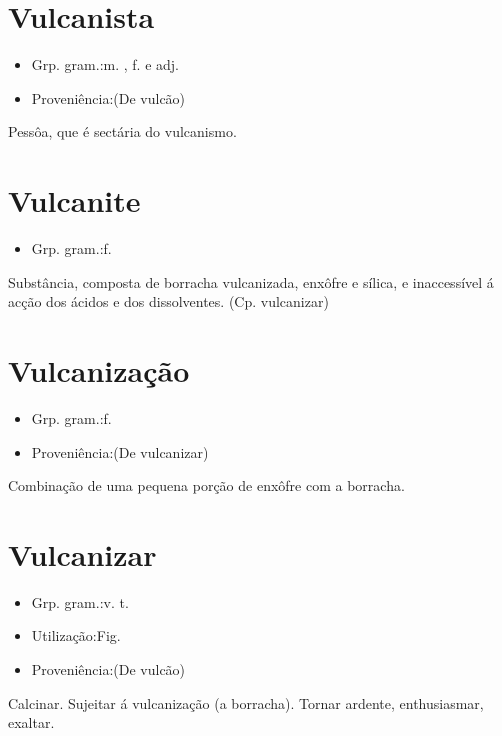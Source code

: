 \documentclass{article}
\begin{document}
\section{Vulcanista}
\begin{itemize}
\item {Grp. gram.:m. ,  f.  e  adj.}
\end{itemize}
\begin{itemize}
\item {Proveniência:(De \textunderscore vulcão\textunderscore )}
\end{itemize}
Pessôa, que é sectária do vulcanismo.
\section{Vulcanite}
\begin{itemize}
\item {Grp. gram.:f.}
\end{itemize}
Substância, composta de borracha vulcanizada, enxôfre e sílica, e inaccessível á acção dos ácidos e dos dissolventes.
(Cp. \textunderscore vulcanizar\textunderscore )
\section{Vulcanização}
\begin{itemize}
\item {Grp. gram.:f.}
\end{itemize}
\begin{itemize}
\item {Proveniência:(De \textunderscore vulcanizar\textunderscore )}
\end{itemize}
Combinação de uma pequena porção de enxôfre com a borracha.
\section{Vulcanizar}
\begin{itemize}
\item {Grp. gram.:v. t.}
\end{itemize}
\begin{itemize}
\item {Utilização:Fig.}
\end{itemize}
\begin{itemize}
\item {Proveniência:(De \textunderscore vulcão\textunderscore )}
\end{itemize}
Calcinar.
Sujeitar á vulcanização (a borracha).
Tornar ardente, enthusiasmar, exaltar.
\end{document}
